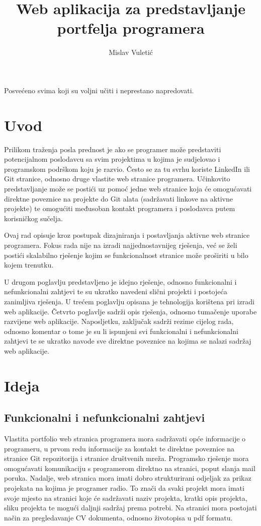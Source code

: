 \documentclass[times, utf8, zavrsni, numeric]{fer}
\begin{document}
\title{Web aplikacija za predstavljanje portfelja programera}
\author{Mislav Vuletić}
\maketitle
\zahvala{}
Posvećeno svima koji su voljni učiti i neprestano napredovati.
\tableofcontents

\chapter{Uvod}
\qquad Prilikom traženja posla prednost je ako se programer može predstaviti potencijalnom poslodavcu sa svim projektima u kojima je sudjelovao i programskom podrškom koju je razvio.
Često se za tu svrhu koriste LinkedIn\footnotemark{} ili Git\footnotemark{} stranice, odnosno druge vlastite web stranice programera.
Učinkovito predstavljanje može se postići uz pomoć jedne web stranice koja će omogućavati direktne poveznice na projekte do Git alata (sadržavati linkove na aktivne projekte) te omogućiti međusoban kontakt programera i poslodavca putem korisničkog sučelja.

Ovaj rad opisuje kroz postupak dizajniranja i postavljanja aktivne web stranice programera.
Fokus rada nije na izradi najjednostavnijeg rješenja, već se želi postići skalabilno rješenje kojim se funkcionalnost stranice može proširiti u bilo kojem trenutku.

U drugom poglavlju predstavljeno je idejno rješenje, odnosno funkcionalni i nefunkcionalni zahtjevi te su ukratko navedeni slični projekti i postojeća zanimljiva rješenja.
U trećem poglavlju opisana je tehnologija korištena pri izradi web aplikacije. Četvrto poglavlje sadrži opis rješenja, odnosno tumačenje uporabe razvijene web aplikacije.
Naposljetku, zaključak sadrži rezime cijelog rada, odnosno komentar o tome je su li ispunjeni svi funkcionalni i nefunkcionalni zahtjevi te se ukratko navode sve direktne poveznice na kojima se nalazi sadržaj web aplikacije.

\chapter{Ideja}
\section{Funkcionalni i nefunkcionalni zahtjevi}
\qquad Vlastita portfolio web stranica programera mora sadržavati opće informacije o programeru, u prvom redu informacije za kontakt te direktne poveznice na stranice Git repozitorija i stranice društvenih mreža.
Programsko rješenje mora omogućavati komunikaciju s programerom direktno na stranici, poput slanja mail poruka.
Nadalje, web stranica mora imati dobro strukturirani odjeljak za prikaz projekata na kojima je programer radio.
To znači da svaki projekt mora imati svoje mjesto na stranici koje će sadržavati naziv projekta, kratki opis projekta, sliku projekta te mogući daljnji sadržaj prema potrebi.
Na stranici mora postojati način za pregledavanje CV dokumenta, odnosno životopisa u pdf formatu.
\end{document}
